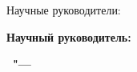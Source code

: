 %
\vspace{0pt plus4fill} %
\begin{flushright}
\ifdefined\supervisorTwoFio
Научные руководители:

\supervisorRegalia

\ifdefined\supervisorDead
\framebox{\supervisorFio}
\else
\supervisorFio
\fi

\supervisorTwoRegalia

\ifdefined\supervisorTwoDead
\framebox{\supervisorTwoFio}
\else
\supervisorTwoFio
\fi
\else
\textbf{Научный руководитель:}

\supervisorRegalia

\ifdefined\supervisorDead
\framebox{\supervisorFio}
\else
\supervisorFio
\fi
\fi

\end{flushright}
%
\vspace{0pt plus4fill} %
{\centering\textbf{\thesisCity\ "--- \thesisYear}\par}
